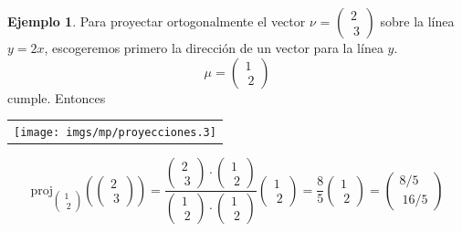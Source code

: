 \documentclass[11pt]{article}
\theoremstyle{definition}
\newtheorem{ejemplo}[ejm]{Ejemplo}
\begin{document}
	\begin{ejemplo}
	Para proyectar ortogonalmente el vector $\nu$ = $\left(\begin{array}{c} 2 \\\ 3\end{array}\right)$ sobre la línea $y = 2x$, escogeremos primero la dirección de un vector para la línea $y$.
	\[\mu = \left(\begin{array}{c} 1 \\\ 2\end{array} \right)\]
	cumple. Entonces 
	\begin{center}  \small \begin{tabular}{@{}c@{}}\texttt{[image: imgs/mp/proyecciones.3]}\end{tabular}
	  \hspace*{6em}
		\[\textrm{proj}_{\left(\begin{array}{c} 1 \\\ 2\end{array}\right)}(\left(\begin{array}{c} 2 \\\ 3\end{array}\right)) = 
		\frac{\left(\begin{array}{c} 2 \\\ 3\end{array}\right)\cdot\left(\begin{array}{c} 1 \\\ 2\end{array}\right)}{ 
	          \left(\begin{array}{c} 1 \\\ 2\end{array}\right)\cdot\left(\begin{array}{c} 1 \\\ 2\end{array}\right)}
	     \left(\begin{array}{c} 1 \\\ 2\end{array}\right) = \displaystyle \frac{8}{5}\left(\begin{array}{c} 1 \\\ 2\end{array}\right)=\left(\begin{array}{c} 8/5 \\\ 16/5\end{array}\right)\]
	\end{center}
	\end{ejemplo}
\end{document}
